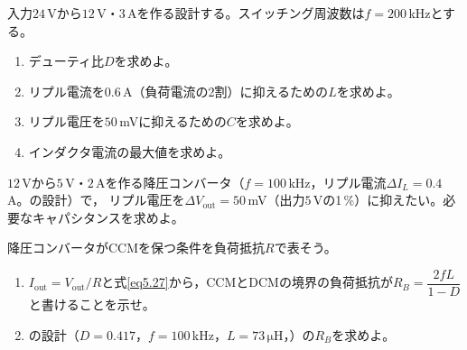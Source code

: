 \begin{章末問題}
\item \label{ex5.4}入力$24$\,Vから$12$\,V・$3$\,Aを作る設計する。スイッチング周波数は$f = 200$\,kHzとする。
\begin{enumerate}
\item[(a)] デューティ比$D$を求めよ。
\item[(b)] リプル電流を$0.6$\,A（負荷電流の2割）に抑えるための$L$を求めよ。
\item[(c)] リプル電圧を$50$\,mVに抑えるための$C$を求めよ。
\item[(d)] インダクタ電流の最大値を求めよ。
\end{enumerate}

\item \label{ex5.5}$12$\,Vから$5$\,V・$2$\,Aを作る降圧コンバータ（$f = 100$\,kHz，リプル電流$\mathit{\Delta}I_L = 0.4$\,A。の設計）で，
リプル電圧を$\mathit{\Delta}V_{\mathrm{out}} = 50$\,mV（出力$5$\,Vの1\,\%）に抑えたい。必要なキャパシタンスを求めよ。

\item \label{ex5.toi7}

\item \label{ex5.6}降圧コンバータがCCMを保つ条件を負荷抵抗$R$で表そう。
\begin{enumerate}
\item[(a)] $I_{\mathrm{out}} = V_{\mathrm{out}}/R$と式\ref{eq5.27}から，CCMとDCMの境界の負荷抵抗が$R_B = \dfrac{2 f L}{1-D}$と書けることを示せ。
\item[(b)] の設計（$D = 0.417$，$f = 100$\,kHz，$L = 73\,\mathrm{\mu H}$，）の$R_B$を求めよ。
\end{enumerate}


\end{章末問題}
